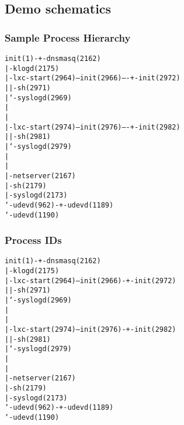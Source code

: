 \subsection{Demo schematics}

\begin{frame}[fragile]
\frametitle{Sample Process Hierarchy}
\begin{alltt}\footnotesize
init(1)-+-dnsmasq(2162)
        |-klogd(2175)
        |-lxc-start(2964)---init(2966)----+-init(2972)
        |                                 |-sh(2971)
        |                                 `-syslogd(2969)
        |
        |
        |-lxc-start(2974)---init(2976)----+-init(2982)
        |                                 |-sh(2981)
        |                                 `-syslogd(2979)
        |
        |
        |-netserver(2167)
        |-sh(2179)
        |-syslogd(2173)
        `-udevd(962)-+-udevd(1189)
                     `-udevd(1190)
\end{alltt}\normalsize
\end{frame}

\begin{frame}[fragile]
\frametitle{Process IDs}
\begin{alltt}\footnotesize
init(1)-+-dnsmasq(2162)
        |-klogd(2175)
        |-lxc-start(2964)---init(2966)-+-init(2972)
        |                                 |-sh(2971)
        |                                 `-syslogd(2969)
        |
        |
        |-lxc-start(2974)---init(2976)-+-init(2982)
        |                                 |-sh(2981)
        |                                 `-syslogd(2979)
        |
        |
        |-netserver(2167)
        |-sh(2179)
        |-syslogd(2173)
        `-udevd(962)-+-udevd(1189)
                     `-udevd(1190)
\end{alltt}\normalsize
\end{frame}

